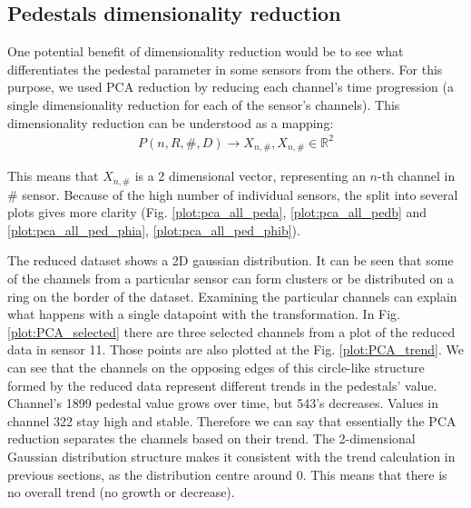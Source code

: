 \subsection{Pedestals dimensionality reduction}

One potential benefit of dimensionality reduction would be to see what differentiates the pedestal parameter in some sensors from the others. For this purpose, we used PCA reduction by reducing each channel's time progression (a single dimensionality reduction for each of the sensor's channels).
This dimensionality reduction can be understood as a mapping:
\begin{align}
  P(n, R, \#, D) \rightarrow X_{n,\#}, X_{n,\#} \in \mathbb{R}^{2}
\end{align}

This means that $X_{n,\#}$ is a 2 dimensional vector, representing an $n$-th channel in $\#$ sensor. 
 Because of the high number of individual sensors, the split into several plots gives more clarity (Fig. \ref{plot:pca_all_peda}, \ref{plot:pca_all_pedb} and \ref{plot:pca_all_ped_phia}, \ref{plot:pca_all_ped_phib}).

  The reduced dataset shows a 2D gaussian distribution.
  It can be seen that some of the channels from a particular sensor can form clusters or be distributed on a ring on the border of the dataset.
  Examining the particular channels can explain what happens with a single datapoint with the transformation.
  In Fig. \ref{plot:PCA_selected} there are three selected channels from a plot of the reduced data in sensor 11.
  Those points are also plotted at the Fig. \ref{plot:PCA_trend}.
  We can see that the channels on the opposing edges of this circle-like structure formed by the reduced data represent different trends in the pedestals' value.
  Channel's 1899 pedestal value grows over time, but 543's decreases.
  Values in channel 322 stay high and stable.
  Therefore we can say that essentially the PCA reduction separates the channels based on their trend.
  The 2-dimensional Gaussian distribution structure makes it consistent with the trend calculation in previous sections, as the distribution centre around 0.
  This means that there is no overall trend (no growth or decrease).
  
